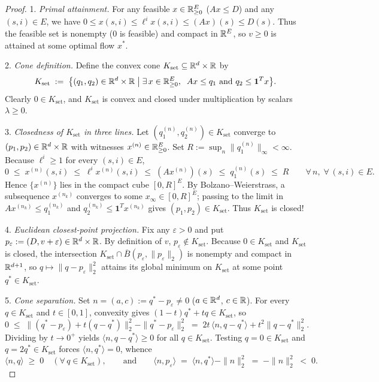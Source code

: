 \begin{proof}
1. \emph{Primal attainment.} For any feasible $x \in \mathbb{R}_{\ge 0}^E$ ($A x \le D$) and any $(s, i) \in E$, we have $0 \le x(s, i) \le \ell^i x(s, i) \le (A x)(s) \le D(s)$. Thus the feasible set is nonempty ($0$ is feasible) and compact in $\mathbb{R}^E$, so $v \ge 0$ is attained at some optimal flow $x^*$.

2. \emph{Cone definition.} Define the convex cone $K_{\mathrm{set}} \subseteq \mathbb{R}^d \times \mathbb{R}$ by
\[
  K_{\mathrm{set}} \;:=\; \bigl\{(q_1, q_2) \in \mathbb{R}^d \times \mathbb{R} \;\big|\; \exists\, x \in \mathbb{R}_{\ge 0}^E,\;\; A x \le q_1 \text{ and } q_2 \le \mathbf{1}^T x\bigr\}.
\]
Clearly $0 \in K_{\mathrm{set}}$, and $K_{\mathrm{set}}$ is convex and closed under multiplication by scalars $\lambda \ge 0$.

3. \emph{Closedness of $K_{\mathrm{set}}$ in three lines.} Let $(q_1^{(n)}, q_2^{(n)}) \in K_{\mathrm{set}}$ converge to $(p_1, p_2) \in \mathbb{R}^d \times \mathbb{R}$ with witnesses $x^{(n)} \in \mathbb{R}_{\ge 0}^E$. Set $R := \sup_n \|q_1^{(n)}\|_\infty < \infty$. Because $\ell^i \ge 1$ for every $(s, i) \in E$,
\[
  0 \;\le\; x^{(n)}(s, i) \;\le\; \ell^i x^{(n)}(s, i) \;\le\; (A x^{(n)})(s) \;\le\; q_1^{(n)}(s) \;\le\; R \qquad \forall\, n,\; \forall\, (s, i) \in E.
\]
Hence $\{x^{(n)}\}$ lies in the compact cube $[0, R]^E$. By Bolzano--Weierstrass, a subsequence $x^{(n_k)}$ converges to some $x_\infty \in [0, R]^E$; passing to the limit in $A x^{(n_k)} \le q_1^{(n_k)}$ and $q_2^{(n_k)} \le \mathbf{1}^T x^{(n_k)}$ gives $(p_1, p_2) \in K_{\mathrm{set}}$. Thus $K_{\mathrm{set}}$ is closed!

4. \emph{Euclidean closest-point projection.} Fix any $\varepsilon > 0$ and put $p_\varepsilon := (D, v + \varepsilon) \in \mathbb{R}^d \times \mathbb{R}$. By definition of $v$, $p_\varepsilon \notin K_{\mathrm{set}}$. Because $0 \in K_{\mathrm{set}}$ and $K_{\mathrm{set}}$ is closed, the intersection $K_{\mathrm{set}} \cap \overline{B}(p_\varepsilon, \|p_\varepsilon\|_2)$ is nonempty and compact in $\mathbb{R}^{d+1}$, so $q \mapsto \|q - p_\varepsilon\|_2^2$ attains its global minimum on $K_{\mathrm{set}}$ at some point $q^* \in K_{\mathrm{set}}$.

5. \emph{Cone separation.} Set $n = (a, c) := q^* - p_\varepsilon \neq 0$ ($a \in \mathbb{R}^d$, $c \in \mathbb{R}$). For every $q \in K_{\mathrm{set}}$ and $t \in [0, 1]$, convexity gives $(1-t)q^* + t q \in K_{\mathrm{set}}$, so
\[
  0 \;\le\; \|(q^* - p_\varepsilon) + t(q - q^*)\|_2^2 - \|q^* - p_\varepsilon\|_2^2
  \;=\; 2t\,\langle n, q - q^* \rangle + t^2\|q - q^*\|_2^2.
\]
Dividing by $t \to 0^+$ yields $\langle n, q - q^* \rangle \ge 0$ for all $q \in K_{\mathrm{set}}$. Testing $q = 0 \in K_{\mathrm{set}}$ and $q = 2q^* \in K_{\mathrm{set}}$ forces $\langle n, q^* \rangle = 0$, whence
\[
  \langle n, q \rangle \;\ge\; 0 \quad (\forall\, q \in K_{\mathrm{set}}),
  \qquad\text{and}\qquad
  \langle n, p_\varepsilon \rangle \;=\; \langle n, q^* \rangle - \|n\|_2^2 \;=\; -\|n\|_2^2 \;<\; 0.
\]


\end{proof}
